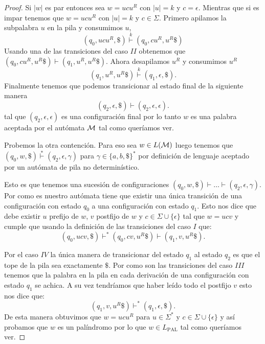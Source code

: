 \documentclass[tesis.tex]{subfiles}
\begin{document}
\begin{proof}
	Si $|w|$ es par entonces sea $w = ucu^R$ con $|u| = k$ y $c=\epsilon$.
	Mientras que si es impar tenemos que $w = ucu^R$ con $|u| = k$ y $c \in \Sigma$.
	Primero apilamos la subpalabra $u$ en la pila y consumimos $u$,
	\[
	(q_{0}, ucu^R, \$) \overset{k}{\vdash} (q_{0},cu^R,u^R\$)
	\]
	Usando una de las transiciones del caso $II$ obtenemos que 
	$(q_{0},cu^R,u^R\$) \vdash (q_{1},u^R,u^R\$)$.
	Ahora desapilamos $u^R$ y consumimos $u^R$
	\[
	(q_{1},u^R,u^R\$) \overset{k}{\vdash} (q_{1},\epsilon,\$).
	\] 
	Finalmente tenemos que podemos transicionar al estado final de la siguiente manera
	\[
		(q_{2}, \epsilon, \$) \vdash (q_{2}, \epsilon, \epsilon).
	\]
	tal que $(q_{2}, \epsilon, \epsilon)$ es una configuración final por lo tanto $w$ es una palabra aceptada por el autómata $\cal M$ tal como queríamos ver.

	Probemos la otra contención.
	Para eso sea $w \in L(\cal M)$ luego tenemos que $(q_{0},w,\$) \overset{*}{\vdash} (q_{2},\epsilon,\gamma)$ para $\gamma \in \{ a,b, \$ \}^*$ por definición de lenguaje aceptado por un autómata de pila no determinístico.
	
	Esto es que tenemos una sucesión de configuraciones $(q_{0},w,\$) \vdash \dots \vdash (q_{2},\epsilon,\gamma)$.
	Por como es nuestro autómata tiene que existir una única transición de una configuración con estado $q_{0}$ a una configuración con estado $q_{1}$.		
	Esto nos dice que debe existir $u$ prefijo de $w$, $v$ postfijo de $w$ y $c \in \Sigma \cup \{ \epsilon \}$ tal que $w = ucv$ y cumple que usando la definición de las transiciones del caso $I$ que:
	\[
		(q_{0}, ucv, \$) \vdash^{*} (q_{0}, cv, u^R \$) \vdash (q_{1}, v, u^R \$).
	\]
	
	Por el caso $IV$ la única manera de transicionar del estado $q_{1}$ al estado $q_{2}$ es que el tope de la pila sea exactamente $ \$ $. 
	Por como son las transiciones del caso $III$ tenemos que la palabra en la pila en cada derivación de una configuración con estado $q_{1}$ se achica. 
	A su vez tendríamos que haber leído todo el postfijo $v$ esto nos dice que: 
	\[
		(q_{1}, v, u^R\$) \vdash^* (q_{1},\epsilon, \$).
	\]
	De esta manera obtuvimos que $w = ucu^R$ para $u \in \Sigma^*$ y $c \in \Sigma \cup \{\epsilon\}$ y así probamos que $w$ es un palíndromo por lo que $w \in L_{\text{PAL}}$ tal como queríamos ver.
	
	
	
	
%	
\end{proof}
\end{document}
